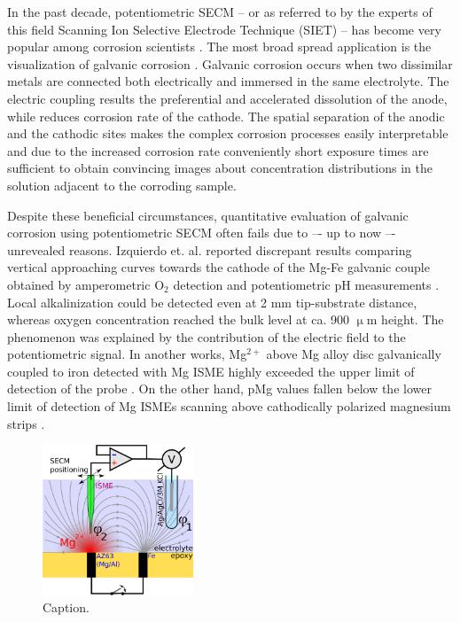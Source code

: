 \documentclass[3p]{elsarticle}
\begin{document}
In the past decade, potentiometric SECM -- or as referred to by the experts of this field Scanning Ion Selective Electrode Technique (SIET) -- has become very popular among corrosion scientists \cite{lamaka, ZnISME, diamondel, cutedge, H+selective, simulating}.
The most broad spread application is the visualization of galvanic corrosion \cite{amperopot, chloride, spatiozn, fezn}.
Galvanic corrosion occurs when two dissimilar metals are connected both electrically and immersed in the same electrolyte. 
The electric coupling results the preferential and accelerated dissolution of the anode, while reduces corrosion rate of the cathode.
The spatial separation of the anodic and the cathodic sites makes the complex corrosion processes easily interpretable and due to the increased corrosion rate conveniently short exposure times are sufficient to obtain convincing images about concentration distributions in the solution adjacent to the corroding sample.

Despite these beneficial circumstances, quantitative evaluation of galvanic corrosion using potentiometric SECM often fails due to –- up to now –- unrevealed reasons.
Izquierdo et. al. reported discrepant results comparing vertical approaching curves towards the cathode of the Mg-Fe galvanic couple obtained by amperometric O$_2$ detection and potentiometric pH measurements \cite{pH15}. Local alkalinization could be detected even at 2 mm tip-substrate distance, whereas oxygen concentration reached the bulk level at ca. 900 $\upmu$m height. The phenomenon was explained by the contribution of the electric field to the potentiometric signal.  
In another works, Mg$^{2+}$ above Mg alloy disc galvanically coupled to iron detected with Mg ISME highly exceeded the upper limit of detection of the probe \cite{overmg1, overmg2, overmg3}.
On the other hand, pMg values fallen below the lower limit of detection of Mg ISMEs scanning above cathodically polarized magnesium strips \cite{belowmg}. 

\begin{figure}
\centering
\includegraphics[width=0.4\textwidth]{abstract.eps}
\caption{Caption.}
\label{fig:abstract}
\end{figure}
\end{document}
